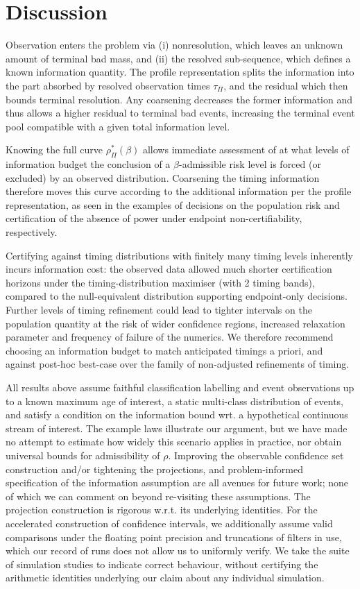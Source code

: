 \section{Discussion}\label{sec:discussion} 
Observation enters the problem via (i) nonresolution, which leaves an unknown amount of terminal bad mass, and (ii) the resolved sub-sequence, which defines a known information quantity. The profile representation splits the information into the part absorbed by resolved observation times $\tau_\Pi$, and the residual which then bounds terminal resolution. Any coarsening decreases the former information and thus allows a higher residual to terminal bad events, increasing the terminal event pool compatible with a given total information level.

Knowing the full curve $\rho_\Pi^*(\beta)$ allows immediate assessment of at what levels of information budget the conclusion of a $\beta$-admissible risk level is forced (or excluded) by an observed distribution. Coarsening the timing information therefore moves this curve according to the additional information per the profile representation, as seen in the examples of decisions on the population risk and certification of the absence of power under endpoint non-certifiability, respectively.

Certifying against timing distributions with finitely many timing levels inherently incurs information cost: the observed data allowed much shorter certification horizons under the timing-distribution maximiser (with 2 timing bands), compared to the null-equivalent distribution supporting endpoint-only decisions. Further levels of timing refinement could lead to tighter intervals on the population quantity at the risk of wider confidence regions, increased relaxation parameter and frequency of failure of the numerics. We therefore recommend choosing an information budget to match anticipated timings a priori, and against post-hoc best-case over the family of non-adjusted refinements of timing.

All results above assume faithful classification labelling and event observations up to a known maximum age of interest, a static multi-class distribution of events, and satisfy a condition on the information bound wrt. a hypothetical continuous stream of interest. The example laws illustrate our argument, but we have made no attempt to estimate how widely this scenario applies in practice, nor obtain universal bounds for admissibility of $\rho$. Improving the observable confidence set construction and/or tightening the projections, and problem-informed specification of the information assumption are all avenues for future work; none of which we can comment on beyond re-visiting these assumptions. The projection construction is rigorous w.r.t. its underlying identities. For the accelerated construction of confidence intervals, we additionally assume valid comparisons under the floating point precision and truncations of filters in use, which our record of runs does not allow us to uniformly verify. We take the suite of simulation studies to indicate correct behaviour, without certifying the arithmetic identities underlying our claim about any individual simulation.

